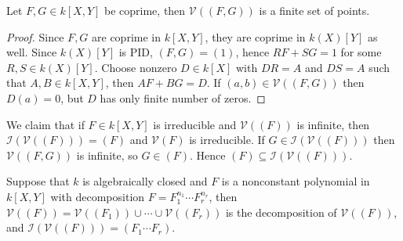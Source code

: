 \documentclass[11pt]{book}
\begin{document}
\begin{proposition}Let $F,G\in k[X,Y]$ be coprime, then $\mathcal{V}((F,G))$ is a finite set of points.
\begin{proof}
Since $F,G$ are coprime in $k[X,Y]$, they are coprime in $k(X)[Y]$ as well. Since $k(X)[Y]$ is PID, $(F,G)=(1)$, hence $RF+SG=1$ for some $R,S\in k(X)[Y]$. Choose nonzero $D\in k[X]$ with $DR=A$ and $DS=A$ such that $A,B\in k[X,Y]$, then $AF+BG=D$. If $(a,b)\in \mathcal{V}((F,G))$ then $D(a)=0$, but $D$ has only finite number of zeros. 
\end{proof}
\end{proposition}
We claim that if $F\in k[X,Y]$ is irreducible and $\mathcal{V}((F))$ is infinite, then $\mathcal{I}(\mathcal{V}((F)))=(F)$ and $\mathcal{V}(F)$ is irreducible. If $G\in \mathcal{I}(\mathcal{V}((F)))$ then $\mathcal{V}((F,G))$ is infinite, so $G\in (F)$. Hence $(F)\subseteq \mathcal{I}(\mathcal{V}((F)))$. 
\begin{proposition}Suppose that $k$ is algebraically closed and $F$ is a nonconstant polynomial in $k[X,Y]$ with decomposition $F=F_1^{n_1}\cdots F_r^{n_r}$, then $\mathcal{V}((F))=\mathcal{V}((F_1))\cup\cdots\cup \mathcal{V}((F_r))$ is the decomposition of $\mathcal{V}((F))$, and $\mathcal{I}(\mathcal{V}((F)))=(F_1\cdots F_r)$.
\end{proposition}
\end{document}
